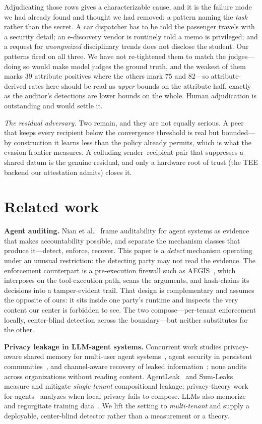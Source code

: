 \documentclass[conference,compsoc]{IEEEtran}
\begin{document}
Adjudicating those rows gives a characterizable cause, and it is the failure mode
we had already found and thought we had removed: a pattern naming the \emph{task}
rather than the secret. A car dispatcher has to be told the passenger travels with
a security detail; an e-discovery vendor is routinely told a memo is privileged;
and a request for \emph{anonymized} disciplinary trends does not disclose the
student. Our patterns fired on all three. We have not re-tightened them to match
the judges---doing so would make model judges the ground truth, and the weakest of
them marks $39$ attribute positives where the others mark $75$ and $82$---so
attribute-derived rates here should be read as \emph{upper} bounds on the attribute
half, exactly as the auditor's detections are lower bounds on the whole. Human
adjudication is outstanding and would settle it.

\emph{The residual adversary.} Two remain, and they are not equally serious. A peer
that keeps every recipient below the convergence threshold is real but bounded---by
construction it learns less than the policy already permits, which is what the
evasion frontier measures. A colluding sender--recipient pair that suppresses a
shared datum is the genuine residual, and only a hardware root of trust (the TEE
backend our attestation admits) closes it.

\section{Related work}

\noindent\textbf{Agent auditing.} Nian et al.~\cite{auditableagents} frame
auditability for agent systems as evidence that makes accountability possible, and
separate the mechanism classes that produce it---detect, enforce, recover. This
paper is a \emph{detect} mechanism operating under an unusual restriction: the
detecting party may not read the evidence. The enforcement counterpart is a
pre-execution firewall such as AEGIS~\cite{aegis}, which interposes on the
tool-execution path, scans the arguments, and hash-chains its decisions into a
tamper-evident trail. That design is complementary and assumes the opposite of
ours: it sits inside one party's runtime and inspects the very content our center
is forbidden to see. The two compose---per-tenant enforcement locally, center-blind
detection across the boundary---but neither substitutes for the other.

\noindent\textbf{Privacy leakage in LLM-agent systems.} Concurrent work studies privacy-aware shared memory for multi-user agent systems~\cite{aim2026}, agent security in persistent communities~\cite{cosec2026}, and channel-aware recovery of leaked information~\cite{cipl2026}; none audits across organizations without reading content. AgentLeak~\cite{agentleak}
and Sum-Leaks~\cite{sumleaks} measure and mitigate \emph{single-tenant}
compositional leakage; privacy-theory work for agents~\cite{dpagents,itlimits}
analyzes when local privacy fails to compose. LLMs also memorize and regurgitate
training data~\cite{carlini21,carlini23}. We lift the setting to \emph{multi-tenant}
and supply a deployable, center-blind detector rather than a measurement or a
theory.
\end{document}
